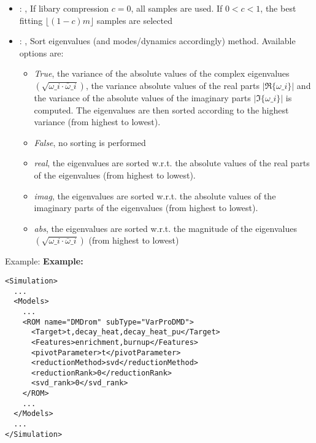 \begin{itemize}
    \item {}: , 
      If libary compression $c = 0$, all samples are used. If $0 < c < 1$, the best fitting
      $\lfloor \left(1 - c\right)m\rfloor$ samples are selected

    \item {}: , 
      Sort eigenvalues (and modes/dynamics accordingly) method. Available options are:
      \begin{itemize}                                                   \item \textit{True}, the
      variance of the absolute values of the complex eigenvalues
      $\left(\sqrt{\omega\_i \cdot \bar{\omega}\_i}\right)$, the variance absolute values
      of the real parts $\left|\Re\{{\omega\_i}\}\right|$ and the variance of the absolute
      values of the imaginary parts $\left|\Im\{{\omega\_i}\}\right|$ is computed. The
      eigenvalues are then sorted according to the highest variance (from highest to lowest).
      \item \textit{False}, no sorting is performed
      \item \textit{real}, the eigenvalues are sorted w.r.t. the absolute values of the real
      parts of the eigenvalues (from highest to lowest).
      \item \textit{imag}, the eigenvalues are sorted w.r.t. the absolute values of the imaginary
      parts of the eigenvalues (from highest to lowest).
      \item \textit{abs}, the eigenvalues are sorted w.r.t. the magnitude of the eigenvalues
      $\left(\sqrt{\omega\_i \cdot \bar{\omega}\_i}\right)$ (from highest to lowest)
      \end{itemize}
  \end{itemize}

\hspace{24pt}
Example:
\textbf{Example:}
\begin{lstlisting}[style=XML,morekeywords={name,subType}]
<Simulation>
  ...
  <Models>
    ...
    <ROM name="DMDrom" subType="VarProDMD">
      <Target>t,decay_heat,decay_heat_pu</Target>
      <Features>enrichment,burnup</Features>
      <pivotParameter>t</pivotParameter>
      <reductionMethod>svd</reductionMethod>
      <reductionRank>0</reductionRank>
      <svd_rank>0</svd_rank>
    </ROM>
    ...
  </Models>
  ...
</Simulation>
\end{lstlisting}

